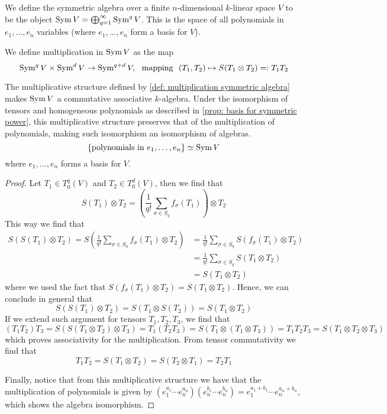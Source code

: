 \begin{definition}
We define the symmetric algebra over a finite \(n\)-dimensional \(k\)-linear
space \(V\) to be the object \(\operatorname{Sym} V = \bigoplus_{q=1}^\infty \operatorname{Sym}^q V\).
This is the space of all polynomials in \(e_1, \dots, e_n\) variables (where
\(e_1, \dots, e_n\) form a basis for \(V\)).

We define multiplication in \(\operatorname{Sym} V\) as the map
\begin{equation}\label{def: multiplication symmetric algebra}
  \operatorname{Sym}^q V \times \operatorname{Sym}^d V \to \operatorname{Sym}^{q + d} V,\ \text{ mapping }\
  (T_1, T_2) \mapsto S(T_1 \otimes T_2) =: T_1 T_2
\end{equation}
\end{definition}

\begin{proposition}
The multiplicative structure defined by \cref{def: multiplication symmetric
algebra} makes \(\operatorname{Sym} V\) a commutative associative \(k\)-algebra. Under the
isomorphism of tensors and homogeneous polynomials as described in
\cref{prop: basis for symmetric power}, this multiplicative structure
preserves that of the multiplication of polynomials, making such isomorphism
an isomorphism of algebras.
\[
  \{\text{polynomials in } e_1, \dots, e_n\} \simeq \operatorname{Sym} V
\]
where \(e_1, \dots, e_n\) forms a basis for \(V\).
\end{proposition}

\begin{proof}
Let \(T_1 \in T_0^q(V)\) and \(T_2 \in T_0^d(V)\), then we find that
\[
  S(T_1) \otimes T_2 = \left( \frac{1}{q!} \sum_{\sigma \in S_q}
  f_\sigma(T_1) \right) \otimes T_2
\]
This way we find that
\begin{align*}
  S(S(T_1) \otimes T_2) = S \left( \frac{1}{q!} \sum_{\sigma \in S_q}
  f_\sigma(T_1) \otimes T_2 \right)
  &= \frac{1}{q!} \sum_{\sigma \in S_q} S(f_\sigma(T_1) \otimes T_2)
  \\
  &= \frac{1}{q!} \sum_{\sigma \in S_q} S(T_1 \otimes T_2) \\
  &= S(T_1 \otimes T_2)
\end{align*}
where we used the fact that \(S(f_\sigma(T_1) \otimes T_2) = S(T_1 \otimes
T_2)\). Hence, we can conclude in general that
\[
  S(S(T_1) \otimes T_2) = S(T_1 \otimes S(T_2)) = S(T_1 \otimes T_2)
\]
If we extend such argument for tensors \(T_1, T_2, T_3\), we find that
\[
  (T_1 T_2) T_3 = S(S(T_1 \otimes T_2) \otimes T_3)
  = T_1 (T_2 T_3) = S(T_1 \otimes (T_1 \otimes T_3))
  = T_1 T_2 T_3 = S(T_1 \otimes T_2 \otimes T_3)
\]
which proves associativity for the multiplication. From tensor commutativity
we find that
\[
  T_1 T_2 = S(T_1 \otimes T_2) = S(T_2 \otimes T_1) = T_2 T_1
\]

Finally, notice that from this multiplicative structure we have that the
multiplication of polynomials is given by
\((e_1^{a_1} \cdots e_n^{a_n}) (e_n^{b_1} \cdots e_n^{b_n}) = e_1^{a_1 + b_1} \cdots e_n^{a_n
+ b_n}\), which shows the algebra isomorphism.
\end{proof}

